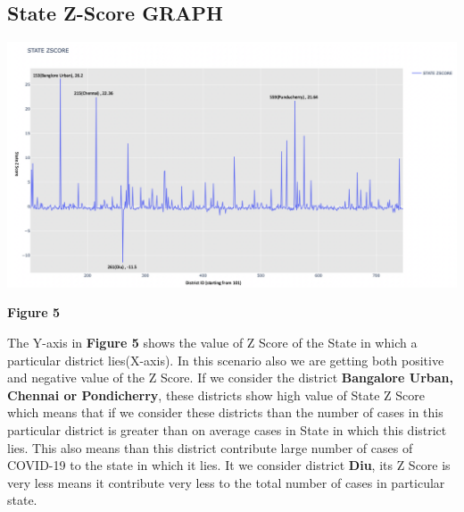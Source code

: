 \documentclass{report}
\begin{document}
\subsection{State Z-Score GRAPH}
\includegraphics[scale=0.33]{State Z Score}
\centerline{\textbf{Figure 5}} \newline\newline
\justify The Y-axis in \textbf{Figure 5} shows the value of Z Score of the State in which a particular district lies(X-axis). In this scenario also we are getting both positive and negative value of the Z Score. 
\newline If we consider the district \textbf{Bangalore Urban, Chennai or Pondicherry}, these districts show high value of State Z Score which means that if we consider these districts than the number of cases in this particular district is greater than on average cases in State in which this district lies. This also means than this district contribute large number of cases of COVID-19 to the state in which it lies.
\newline It we consider district \textbf{Diu}, its Z Score is very less means it contribute very less to the total number of cases in particular state.

\newpage
\end{document}
